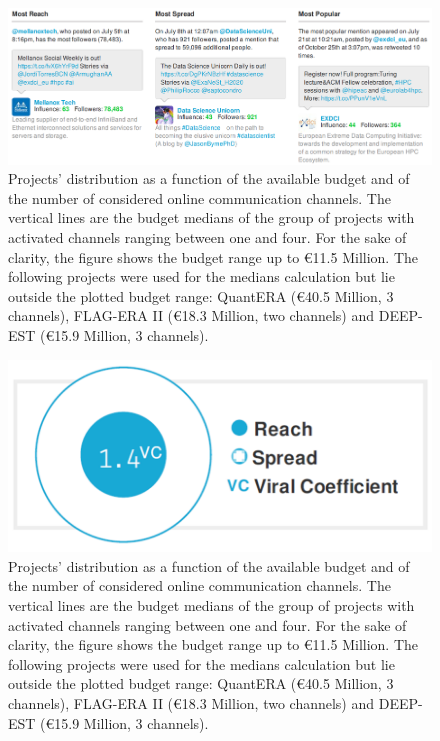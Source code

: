 \begin{figure}[!t] 
 \begin{center}
 \includegraphics[scale=0.41]{Images/HPC_Most_reach_spread_popular.png}
 \caption{Projects' distribution as a function of the available budget and of the number of considered online communication channels. The vertical lines are the budget medians of the group of projects with activated channels ranging between one and four. For the sake of clarity, the figure shows the budget range up to \euro 11.5 Million. The following projects were used for the medians calculation but lie outside the plotted budget range: QuantERA (\euro 40.5 Million, 3 channels), FLAG-ERA II (\euro 18.3 Million, two channels) and DEEP-EST (\euro 15.9 Million, 3 channels).}
 \label{HPC_Most_reach_spread_popular}
 \end{center}
\end{figure}

\begin{figure}[!t] 
 \begin{center}
 \includegraphics[scale=0.2]{Images/HPC_viral_coefficient.png}
 \caption{Projects' distribution as a function of the available budget and of the number of considered online communication channels. The vertical lines are the budget medians of the group of projects with activated channels ranging between one and four. For the sake of clarity, the figure shows the budget range up to \euro 11.5 Million. The following projects were used for the medians calculation but lie outside the plotted budget range: QuantERA (\euro 40.5 Million, 3 channels), FLAG-ERA II (\euro 18.3 Million, two channels) and DEEP-EST (\euro 15.9 Million, 3 channels).}
 \label{HPC_viral_coefficient}
 \end{center}
\end{figure}

